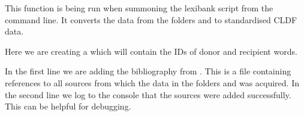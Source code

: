 \documentclass[letterpaper,10pt,english]{sphinxmanual}
\begin{document}
\begin{sphinxVerbatim}[commandchars=\\\{\}]
  
\end{sphinxVerbatim}

\sphinxAtStartPar
This function is being run when summoning the lexibank script from the
command line. It converts the data from the folders  and  to
standardised CLDF data.

\begin{sphinxVerbatim}[commandchars=\\\{\}]
\end{sphinxVerbatim}

\sphinxAtStartPar
Here we are creating a 
 which will contain the IDs of donor and recipient
words.

\begin{sphinxVerbatim}[commandchars=\\\{\}]
\end{sphinxVerbatim}

\sphinxAtStartPar
In the first line we are adding the bibliography from .
This is a  file containing
references to all sources from which the data in the folders  and
 was acquired. In the second line we log to the console
that the sources were added successfully. This can be helpful for debugging.
\end{document}
